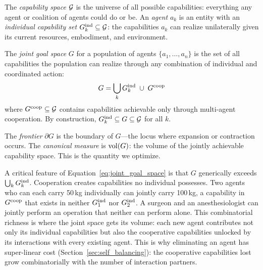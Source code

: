 
\begin{definition}
\label{def:capability_space}
The \emph{capability space} $\mathcal{G}$ is the universe of all possible capabilities:
    everything any agent or coalition of agents could do or be. An \emph{agent}
    $a_k$ is an entity with an \emph{individual capability set} $G_{k}^{\mathrm{ind}}
    \subseteq \mathcal{G}$: the capabilities $a_k$ can realize unilaterally given its
    current resources, embodiment, and environment.
\end{definition}


\begin{definition}
\label{def:joint_goal_space}
The \emph{joint goal space} $G$ for a population of agents $\{a_1, \ldots,
    a_n\}$ is the set of all capabilities the population can realize through
    any combination of individual and coordinated action:
\begin{equation}
\label{eq:joint_goal_space}
G = \bigcup_k G_{k}^{\mathrm{ind}} \;\cup\; G^{\mathrm{coop}}
\end{equation}
where $G^{\mathrm{coop}} \subseteq \mathcal{G}$ contains capabilities achievable only through
    multi-agent cooperation. By construction, $G_{k}^{\mathrm{ind}} \subseteq G \subseteq
    \mathcal{G}$ for all $k$.
\end{definition}

The \emph{frontier} $\partial G$ is the boundary of $G$---the locus where
expansion or contraction occurs. The \emph{canonical measure} is $\operatorname{vol}(G)$: the
volume of the jointly achievable capability space. This is the quantity we
optimize.

A critical feature of Equation~\eqref{eq:joint_goal_space} is that $G$
generically exceeds $\bigcup_k G_{k}^{\mathrm{ind}}$. Cooperation creates capabilities no
individual possesses. Two agents who can each carry 50\,kg individually can
jointly carry 100\,kg, a capability in $G^{\mathrm{coop}}$ that exists in neither
$G_{1}^{\mathrm{ind}}$ nor $G_{2}^{\mathrm{ind}}$. A surgeon and an anesthesiologist can jointly
perform an operation that neither can perform alone. This combinatorial
richness is where the joint space gets its volume: each new agent contributes
not only its individual capabilities but also the cooperative capabilities
unlocked by its interactions with every existing agent. This is why eliminating
an agent has super-linear cost (Section~\ref{sec:self_balancing}): the
cooperative capabilities lost grow combinatorially with the number of
interaction partners.


